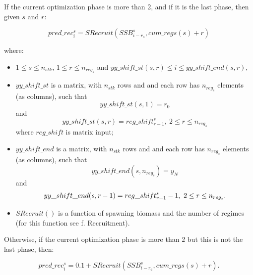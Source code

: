 \documentclass{article}
\begin{document}
If the current optimization phase is more than 2, and if it is the last phase, then given $s$ and $r$:

\begin{equation}
    pred\_rec_{i}^s=SRecruit(SSB^s_{i-r_a},cum\_regs(s)+r)
\end{equation}

where: 

\begin{itemize}
    \item $1\leq s \leq n_{stk}$, $1\leq r \leq n_{reg_s}$ and $yy\_shift\_st(s,r)\leq i \leq yy\_shift\_end(s,r)$,
    
    \item $yy\_shift\_st$ is a matrix, with $n_{stk}$ rows and and each row has $n_{reg_s}$ elements (as columns), such that
    \begin{equation} \label{eq: yyshiftst}
        yy\_shift\_st(s,1)=r_0
    \end{equation}
    and
    \begin{equation*}
         yy\_shift\_st(s,r) = reg\_shift^s_{r-1}, \ 2\leq r \leq n_{reg_s}
    \end{equation*}
    where $reg\_shift$ is matrix input; 
    \item $yy\_shift\_end$ is  a matrix, with $n_{stk}$ rows and and each row has $n_{reg_s}$ elements (as columns), such that
    \begin{equation} \label{eq: yyshiftend}
        yy\_shift\_end(s,n_{reg_s})= y_N
    \end{equation}
    and
    \begin{equation*}
        yy\_shift\_end(s,r-1)=reg\_shift^s_{r-1}-1, \ 2 \leq r \leq n_{reg_s}. \\
    \end{equation*}
    \item $SRecruit()$ is a function of spawning biomass and the number of regimes (for this function see f. Recruitment).
\end{itemize}

Otherwise, if the current optimization phase is more than 2 but this is not the last phase, then:

\begin{equation}
    pred\_rec^s_i = 0.1+SRecruit(SSB^s_{i-r_a},cum\_regs(s)+r).
\end{equation}
\end{document}
